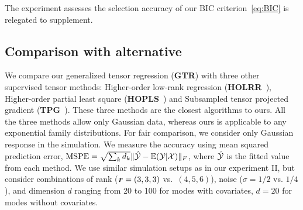 \documentclass{article}
\theoremstyle{plain}
\theoremstyle{definition}
\begin{document}
The experiment assesses the selection accuracy of our BIC criterion~\eqref{eq:BIC} is relegated to supplement.
\vspace{-.15cm}
\subsection{Comparison with alternative }
\vspace{-.1cm}
We compare our generalized tensor regression ({\bf GTR}) with three other supervised tensor methods: Higher-order low-rank regression ({\bf HOLRR}~\cite{rabusseau2016low}), Higher-order partial least square ({\bf HOPLS}~\cite{zhao2012higher})  and Subsampled tensor projected gradient ({\bf TPG}~\cite{yu2016learning}). These three methods are the closest algorithms to ours. All the three methods allow only Gaussian data, whereas ours is applicable to any exponential family distributions. For fair comparison, we consider only Gaussian response in the simulation. We measure the accuracy using mean squared prediction error, $\text{MSPE}=\sqrt{\sum_kd_k}\lVert\hat {\mathcal{Y}}-\mathbb{E}(\mathcal{Y}|\mathcal{X})\rVert_F$, where $\hat {\mathcal{Y}}$ is the fitted value from each method.  We use similar simulation setups as in our experiment II, but consider combinations of rank ($\bm{r}=(3,3,3)$ vs.\ $(4,5,6)$), noise ($\sigma = 1/2$ vs. $1/4$), and dimension $d$ ranging from 20 to 100 for modes with covariates, $d = 20$ for modes without covariates. 
\end{document}

